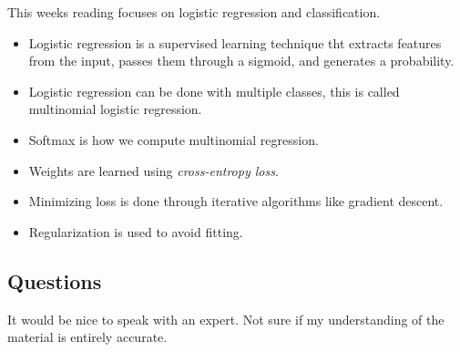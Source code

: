 \documentclass{article}
\begin{document}
This weeks reading focuses on logistic regression and classification.
\begin{itemize}
    \item Logistic regression is a supervised learning technique tht extracts features from the input, passes them through a sigmoid, and generates a probability.
    \item Logistic regression can be done with multiple classes, this is called multinomial logistic regression.
    \item Softmax is how we compute multinomial regression.
    \item Weights are learned using \textit{cross-entropy loss}.
    \item Minimizing loss is done through iterative algorithms like gradient descent.
    \item Regularization is used to avoid fitting.
\end{itemize}



\subsection{Questions}

It would be nice to speak with an expert. Not sure if my understanding of the material is entirely accurate.
\end{document}
